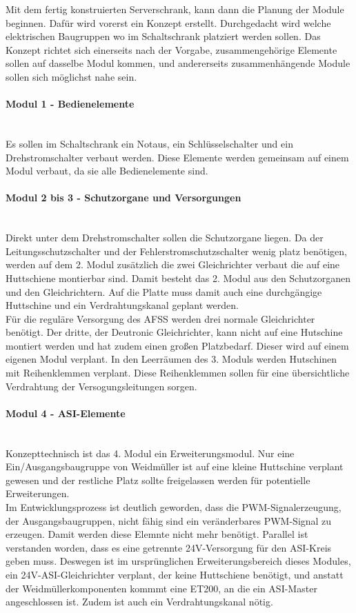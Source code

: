     Mit dem fertig konstruierten Serverschrank, kann dann die Planung der Module beginnen. Dafür wird vorerst ein Konzept erstellt. Durchgedacht wird welche elektrischen Baugruppen wo im Schaltschrank platziert werden sollen. Das Konzept richtet sich einerseits nach der Vorgabe, zusammengehörige Elemente sollen auf dasselbe Modul kommen, und andererseits zusammenhängende Module sollen sich möglichst nahe sein. 
    \paragraph{Modul 1 - Bedienelemente}\mbox{}\\
    Es sollen im Schaltschrank ein Notaus, ein Schlüsselschalter und ein Drehstromschalter verbaut werden. Diese Elemente werden gemeinsam auf einem Modul verbaut, da sie alle Bedienelemente sind.
    \paragraph{Modul 2 bis 3 - Schutzorgane und Versorgungen}\mbox{}\\
    Direkt unter dem Drehstromschalter sollen die Schutzorgane liegen. Da der Leitungsschutzschalter und der Fehlerstromschutzschalter wenig platz benötigen, werden auf dem 2. Modul zusätzlich die zwei Gleichrichter verbaut die auf eine Huttschiene montierbar sind. Damit besteht das 2. Modul aus den Schutzorganen und den Gleichrichtern. Auf die Platte muss damit auch eine durchgängige Huttschine und ein Verdrahtungskanal geplant werden.\\
    Für die reguläre Versorgung des AFSS werden drei normale Gleichrichter benötigt. Der dritte, der Deutronic Gleichrichter, kann nicht auf eine Hutschine montiert werden und hat zudem einen großen Platzbedarf. Dieser wird auf einem eigenen Modul verplant. In den Leerräumen des 3. Moduls werden Hutschinen mit Reihenklemmen verplant. Diese Reihenklemmen sollen für eine übersichtliche Verdrahtung der Versogungsleitungen sorgen.
    \paragraph{Modul 4 - ASI-Elemente}\mbox{}\\
    Konzepttechnisch ist das 4. Modul ein Erweiterungsmodul. Nur eine Ein/Ausgangsbaugruppe von Weidmüller ist auf eine kleine Huttschine verplant gewesen und der restliche Platz sollte freigelassen werden für potentielle Erweiterungen.\\
    Im Entwicklungsprozess ist deutlich geworden, dass die PWM-Signalerzeugung, der Ausgangsbaugruppen, nicht fähig sind ein veränderbares PWM-Signal zu erzeugen. Damit werden diese Elemnte nicht mehr benötigt. Parallel ist verstanden worden, dass es eine getrennte 24V-Versorgung für den ASI-Kreis geben muss. Deswegen ist im ursprünglichen Erweiterungsbereich dieses Modules, ein 24V-ASI-Gleichrichter verplant, der keine Huttschiene benötigt, und anstatt der Weidmüllerkomponenten kommmt eine ET200, an die ein ASI-Master angeschlossen ist. Zudem ist auch ein Verdrahtungskanal nötig.
